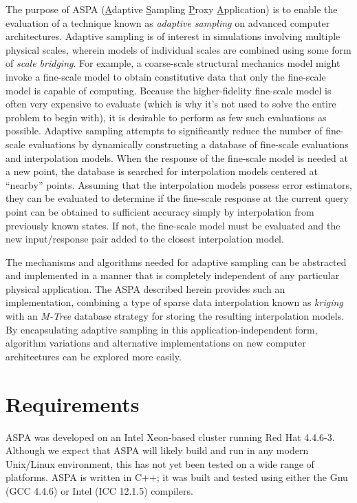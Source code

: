 \documentclass[12pt]{article}
\begin{document}
The purpose of ASPA (\underline{A}daptive \underline{S}ampling
\underline{P}roxy \underline{A}pplication) is to enable the evaluation
of a technique known as {\em adaptive sampling} on advanced computer
architectures.  Adaptive sampling is of interest in simulations
involving multiple physical scales, wherein models of individual
scales are combined using some form of {\em scale bridging}.  For
example, a coarse-scale structural mechanics model might invoke a
fine-scale model to obtain constitutive data that only the fine-scale
model is capable of computing.  Because the higher-fidelity fine-scale
model is often very expensive to evaluate (which is why it's not used
to solve the entire problem to begin with), it is desirable to perform
as few such evaluations as possible.  Adaptive sampling
\cite{Barton2008,Knap2008} attempts to significantly reduce the number
of fine-scale evaluations by dynamically constructing a database of
fine-scale evaluations and interpolation models.  When the response of
the fine-scale model is needed at a new point, the database is
searched for interpolation models centered at ``nearby'' points.
Assuming that the interpolation models possess error estimators, they
can be evaluated to determine if the fine-scale response at the
current query point can be obtained to sufficient accuracy simply by
interpolation from previously known states.  If not, the fine-scale
model must be evaluated and the new input/response pair added to the
closest interpolation model.

The mechanisms and algorithms needed for adaptive sampling can be
abstracted and implemented in a manner that is completely independent
of any particular physical application.  The ASPA described herein
provides such an implementation, combining a type of sparse data
interpolation known as {\em kriging} with an {\em M-Tree} database strategy for storing the
resulting interpolation models.  By encapsulating adaptive
sampling in this application-independent form, algorithm variations and alternative
implementations on new computer architectures can be explored more easily.

\section{Requirements}

ASPA was developed on an Intel Xeon-based cluster running Red Hat
4.4.6-3.  Although we expect that ASPA will likely build and run in
any modern Unix/Linux environment, this has not yet been tested on a
wide range of platforms.  ASPA is written in C++; it was built and
tested using either the Gnu (GCC 4.4.6) or Intel (ICC
12.1.5) compilers.
\end{document}
